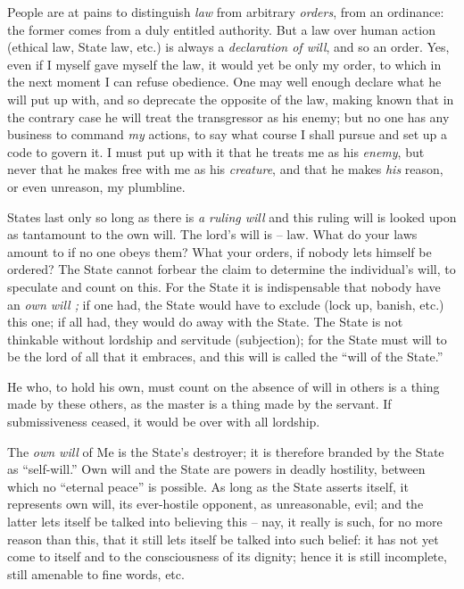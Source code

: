 People are at pains to distinguish \textit{law} from arbitrary \textit{orders}, 
from an ordinance: the former comes from a duly entitled authority. But a law 
over human action (ethical law, State law, etc.) is always a 
\textit{declaration of will}, and so an order. Yes, even if I myself gave 
myself the law, it would yet be only my order, to which in the next moment I 
can refuse obedience. One may well enough declare what he will put up with, 
and so deprecate the opposite of the law, making known that in the contrary 
case he will treat the transgressor as his enemy; but no one has any business 
to command \textit{my} actions, to say what course I shall pursue and set up a 
code to govern it. I must put up with it that he treats me as his 
\textit{enemy}, but never that he makes free with me as his \textit{creature}, 
and that he makes \textit{his} reason, or even unreason, my plumbline.

States last only so long as there is \textit{a ruling will} and this ruling 
will is looked upon as tantamount to the own will. The lord's will is -- law. 
What do your laws amount to if no one obeys them? What your orders, if nobody 
lets himself be ordered? The State cannot forbear the claim to determine the 
individual's will, to speculate and count on this. For the State it is 
indispensable that nobody have an \textit{own will ;} if one had, the State 
would have to exclude (lock up, banish, etc.) this one; if all had, they would 
do away with the State. The State is not thinkable without lordship and 
servitude (subjection); for the State must will to be the lord of all that it 
embraces, and this will is called the ``will of the State.''

He who, to hold his own, must count on the absence of will in others is a 
thing made by these others, as the master is a thing made by the servant. If 
submissiveness ceased, it would be over with all lordship.

The \textit{own will} of Me is the State's destroyer; it is therefore branded 
by the State as ``self-will.'' Own will and the State are powers in deadly 
hostility, between which no ``eternal peace'' is possible. As long as the 
State asserts itself, it represents own will, its ever-hostile opponent, as 
unreasonable, evil; and the latter lets itself be talked into believing this 
-- nay, it really is such, for no more reason than this, that it still lets 
itself be talked into such belief: it has not yet come to itself and to the 
consciousness of its dignity; hence it is still incomplete, still amenable to 
fine words, etc.

